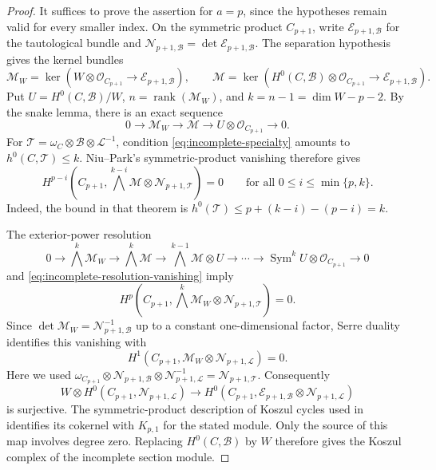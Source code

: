 \documentclass[11pt,reqno]{amsart}
\numberwithin{equation}{section}
\theoremstyle{remark}
\newcommand{\sshf}[1]{\mathcal{O}_{#1}}
\newcommand{\shf}[1]{\mathscr{#1}}
\newcommand{\Sym}{\operatorname{Sym}}
\newcommand{\rk}[1]{\operatorname{rank}(#1)}
\begin{document}
\begin{proof}
It suffices to prove the assertion for \(a=p\), since the
hypotheses remain valid for every smaller index. On the symmetric product
\(C_{p+1}\), write
\(\shf{E}_{p+1,\shf{B}}\) for the tautological bundle and
\(\shf{N}_{p+1,\shf{B}}=\det\shf{E}_{p+1,\shf{B}}\).
The separation hypothesis gives the kernel bundles
\[
 \shf{M}_W=\ker(W\otimes\sshf{C_{p+1}}\longrightarrow
                         \shf{E}_{p+1,\shf{B}}),\qquad
 \shf{M}=\ker(H^0(C,\shf{B})\otimes\sshf{C_{p+1}}\longrightarrow
                         \shf{E}_{p+1,\shf{B}}).
\]
Put \(U=H^0(C,\shf{B})/W\), \(n=\rk{\shf{M}_W}\), and
\(k=n-1=\dim W-p-2\). By the snake lemma, there is an exact sequence
\[
 0\longrightarrow\shf{M}_W\longrightarrow\shf{M}
 \longrightarrow U\otimes\sshf{C_{p+1}}\longrightarrow0.
\]
For \(\shf{T}=\omega_C\otimes\shf{B}\otimes\shf{L}^{-1}\),
condition \eqref{eq:incomplete-specialty} amounts to \(h^0(C,\shf{T})\leq k\).
Niu--Park's symmetric-product vanishing
\cite[Theorem 3.5]{NiuPark} therefore gives
\begin{equation}\label{eq:incomplete-resolution-vanishing}
 H^{p-i}\!\left(C_{p+1},
 \bigwedge^{k-i}\shf{M}\otimes\shf{N}_{p+1,\shf{T}}\right)=0
 \quad\quad \text{for all } 0\leq i\leq\min\{p,k\}.
\end{equation}
Indeed, the bound in that theorem is
\(h^0(\shf{T})\leq p+(k-i)-(p-i)=k\).

The exterior-power resolution
\[
 0\to\bigwedge^k\shf{M}_W\to\bigwedge^k\shf{M}
 \to\bigwedge^{k-1}\shf{M}\otimes U
 \to\cdots\to\Sym^kU\otimes\sshf{C_{p+1}}\to0
\]
and \eqref{eq:incomplete-resolution-vanishing} imply
\[
 H^p\!\left(C_{p+1},\bigwedge^k\shf{M}_W
                  \otimes\shf{N}_{p+1,\shf{T}}\right)=0.
\]
Since \(\det\shf{M}_W=\shf{N}_{p+1,\shf{B}}^{-1}\)
up to a constant one-dimensional factor, Serre duality identifies
this vanishing with
\[
 H^1(C_{p+1},\shf{M}_W\otimes\shf{N}_{p+1,\shf{L}})=0.
\]
Here we used
\(\omega_{C_{p+1}}\otimes\shf{N}_{p+1,\shf{B}}
\otimes\shf{N}_{p+1,\shf{L}}^{-1}
=\shf{N}_{p+1,\shf{T}}\).
Consequently
\[
 W\otimes H^0(C_{p+1},\shf{N}_{p+1,\shf{L}})
 \longrightarrow H^0(C_{p+1},
 \shf{E}_{p+1,\shf{B}}\otimes\shf{N}_{p+1,\shf{L}})
\]
is surjective. The symmetric-product description of Koszul cycles
used in \cite[Section 1]{NiuPark} identifies its cokernel with
\(K_{p,1}\) for the stated module. Only the source of this map involves degree zero.
Replacing \(H^0(C,\shf{B})\) by \(W\) therefore gives
the Koszul complex of the incomplete section module.
\end{proof}
\end{document}
